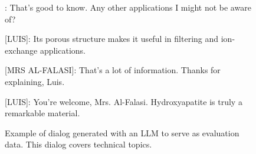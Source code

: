 \begin{figure}
\begin{tcolorbox}: That's good to know. Any other applications I might not be aware of?

[LUIS]: Its porous structure makes it useful in filtering and ion-exchange applications.

[MRS AL-FALASI]: That's a lot of information. Thanks for explaining, Luis.

[LUIS]: You're welcome, Mrs. Al-Falasi. Hydroxyapatite is truly a remarkable material.
    \end{tcolorbox}
    \caption{Example of dialog generated with an LLM to serve as evaluation
    data. This dialog covers technical topics.}
    \label{fig:dialog-example-tech}
\end{figure}
